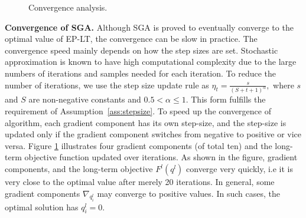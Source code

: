 \begin{figure}[!t]
	\centering
	\caption{Convergence analysis.}
	\label{fig:convergence}
\end{figure}

\textbf{Convergence of SGA.} Although SGA is proved to eventually
converge to the optimal value of EP-LT, the convergence can be slow in
practice. The convergence speed mainly depends on how the step sizes
are set. Stochastic approximation is known to have high computational
complexity due to the large numbers of iterations and samples needed
for each iteration. To reduce the number of iterations, we use the
step size update rule as $\eta_t=\frac{s}{(S+t+1)^\alpha},$ where
$s$ and $S$ are non-negative constants and $ 0.5 < \alpha \leq
1$. This form fulfills the requirement of
Assumption~\ref{ass:stepsize}.
To speed up the convergence of algorithm, each gradient component has
its own step-size, and the step-size is updated only if the gradient
component switches from negative to positive or vice versa. Figure
\ref{fig:convergence} illustrates four gradient components (of total
ten) and the long-term objective function updated over iterations. As
shown in the figure, gradient components, and the long-term objective
$F^l(q^l)$ converge very quickly, i.e it is very close to the optimal
value after merely 20 iterations. In general, some gradient components
$\nabla_{q^l_i}$ may converge to positive values. In such cases, the
optimal solution has $q^l_i=0$.

